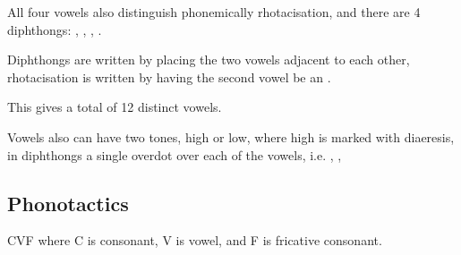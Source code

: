 All four vowels also distinguish phonemically rhotacisation, and there are 4 diphthongs: , , , . 

Diphthongs are written by placing the two vowels adjacent to each other, rhotacisation is written by having the second vowel be an .

This gives a total of 12 distinct vowels.

Vowels also can have two tones, high or low, where high is marked with diaeresis, in diphthongs a single overdot over each of the vowels, i.e. \orth{\eD}, \orth{\uO\eO}, \orth{\oO\uO}

\subsection{Phonotactics}

CVF where C is consonant, V is vowel, and F is fricative consonant.